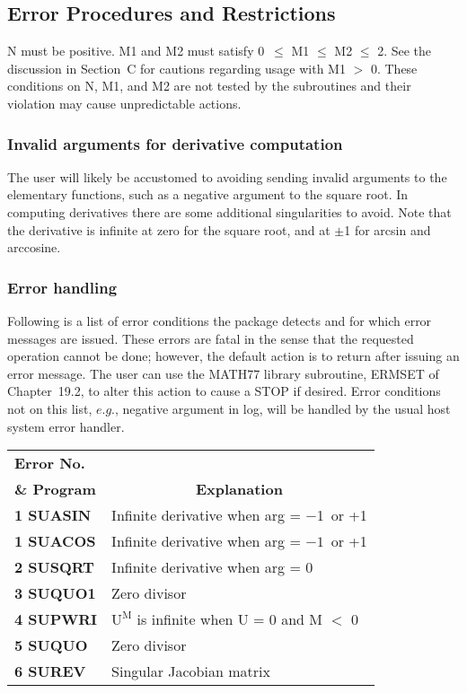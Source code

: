 \documentclass[twoside]{MATH77}
\begin{document}
\nocite{Griewank:1991:ADA}
\nocite{Lawson:1971:CDU}



\subsection{Error Procedures and Restrictions}

N must be positive. M1 and M2 must satisfy 0\ $\leq $ M1
$\leq $ M2 $\leq $ 2. See the discussion in Section~C for cautions regarding
usage with M1 $>$ 0. These conditions on N, M1, and M2 are not tested by
the subroutines and their violation may cause unpredictable actions.

\subsubsection{Invalid arguments for derivative computation}

The user will likely be accustomed to avoiding sending invalid arguments to
the elementary functions, such as a negative argument to the square root. In
computing derivatives there are some additional singularities to avoid. Note
that the derivative is infinite at zero for the square root, and at $\pm $1
for arcsin and arccosine.

\subsubsection{Error handling}

Following is a list of error conditions the package detects and for which error
messages are issued. These errors are fatal in the sense that the requested
operation cannot be done; however, the default action is to return after
issuing an error message. The user can use the MATH77 library subroutine,
ERMSET of Chapter~19.2, to alter this action to cause a STOP if desired. Error conditions
not on this list, $e.g.$, negative argument in log, will be handled by the
usual host system error handler.

\begin{tabular}{@{}l@{\ \ }l}
\bf Error No.\\
\bf \& Program & \multicolumn{1}{c}{\bf Explanation}\\
\bf 1 SUASIN & Infinite derivative when arg = $-$1\ or +1\\
\bf 1 SUACOS & Infinite derivative when arg = $-1$\ or +1\\
\bf 2 SUSQRT & Infinite derivative when arg = 0\\
\bf 3 SUQUO1 & Zero divisor\\
\bf 4 SUPWRI & $\text{U}^{\text{M}}$ is infinite when U = 0 and M $<$ 0\\
\bf 5 SUQUO & Zero divisor\\
\bf 6 SUREV & Singular Jacobian matrix
\end{tabular}
\end{document}
